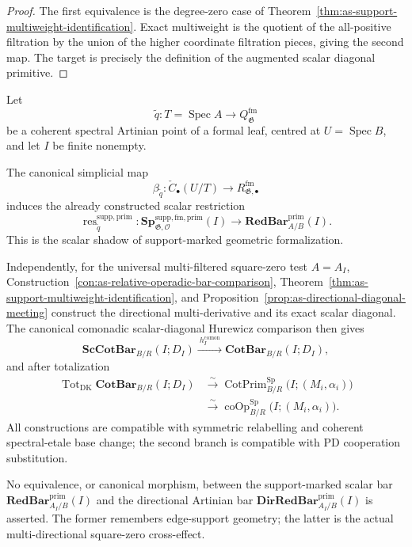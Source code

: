 \begin{proof}
The first equivalence is the degree-zero case of
Theorem~\ref{thm:as-support-multiweight-identification}.  Exact multiweight is
the quotient of the all-positive filtration by the union of the higher
coordinate filtration pieces, giving the second map.  The target is precisely
the definition of the augmented scalar diagonal primitive.
\end{proof}

\begin{theorem}
\label{thm:as-formalized-operation-linearization}
Let
\[
    \widetilde q:
    T=\operatorname{Spec}A\longrightarrow Q_{\mathfrak G}^{\mathrm{fm}}
\]
be a coherent spectral Artinian point of a formal leaf, centred at
$U=\operatorname{Spec}B$, and let $I$ be finite nonempty.

The canonical simplicial map
\[
    \beta_{\widetilde q}:
    \check C_\bullet(U/T)
    \longrightarrow
    R_{\mathfrak G,\bullet}^{\mathrm{fm}}
\]
induces the already constructed scalar restriction
\[
\boxed{
    \operatorname{res}^{\mathrm{supp,prim}}_{\widetilde q}:
    \mathbf{Sp}^{\mathrm{supp,fm,prim}}_{\mathfrak G,\mathcal O}(I)
    \longrightarrow
    \mathbf{RedBar}^{\mathrm{prim}}_{A/B}(I).
}
\]
This is the scalar shadow of support-marked geometric formalization.

Independently, for the universal multi-filtered square-zero test $A=A_I$,
Construction~\ref{con:as-relative-operadic-bar-comparison},
Theorem~\ref{thm:as-support-multiweight-identification}, and
Proposition~\ref{prop:as-directional-diagonal-meeting} construct the
directional multi-derivative and its exact scalar diagonal.  The canonical
comonadic scalar-diagonal Hurewicz comparison then gives
\[
\boxed{
    \mathbf{ScCotBar}_{B/R}(I;D_I)
    \xrightarrow{\ h_I^{\mathrm{comon}}\ }
    \mathbf{CotBar}_{B/R}(I;D_I),
}
\]
and after totalization
\[
\boxed{
\begin{aligned}
    \operatorname{Tot}_{\mathrm{DK}}\mathbf{CotBar}_{B/R}(I;D_I)
    &\xrightarrow{\sim}
    \operatorname{CotPrim}^{\mathrm{Sp}}_{B/R}
    \bigl(I;(M_i,\alpha_i)\bigr)\\
    &\xrightarrow{\sim}
    \operatorname{coOp}^{\mathrm{Sp}}_{B/R}
    \bigl(I;(M_i,\alpha_i)\bigr).
\end{aligned}}
\]
All constructions are compatible with symmetric relabelling and coherent
spectral-etale base change; the second branch is compatible with PD
cooperation substitution.

No equivalence, or canonical morphism, between the support-marked scalar bar
$\mathbf{RedBar}^{\mathrm{prim}}_{A_I/B}(I)$ and the directional Artinian bar
$\mathbf{DirRedBar}^{\mathrm{prim}}_{A_I/B}(I)$ is asserted.  The former
remembers edge-support geometry; the latter is the actual multi-directional
square-zero cross-effect.
\end{theorem}


